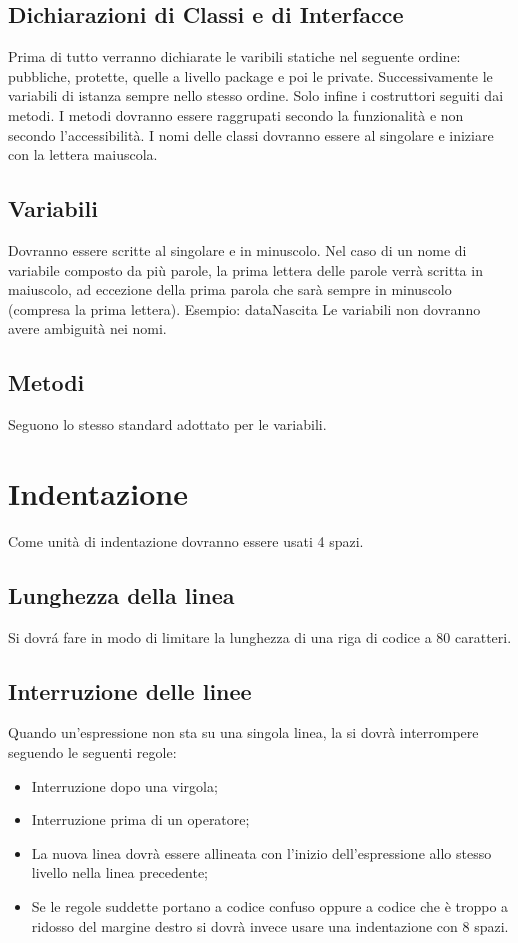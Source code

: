\subsection{Dichiarazioni di Classi e di Interfacce}
Prima di tutto verranno dichiarate le varibili statiche nel seguente ordine: pubbliche, protette, quelle a livello package e poi le private. Successivamente le variabili di istanza sempre nello stesso ordine. Solo infine i costruttori seguiti dai metodi. I metodi dovranno essere raggrupati secondo la funzionalit\`a e non secondo l'accessibilit\`a. I nomi delle classi dovranno essere al singolare e iniziare con la lettera maiuscola.
\subsection{Variabili}
Dovranno essere scritte al singolare e in minuscolo. Nel caso di un nome di variabile composto da pi\`u parole, la prima lettera delle parole verr\`a scritta in maiuscolo, ad eccezione della prima parola che sar\`a sempre in minuscolo (compresa la prima lettera). \newline
Esempio: dataNascita \newline
Le variabili non dovranno avere ambiguit\`a nei nomi.
\subsection{Metodi}
Seguono lo stesso standard adottato per le variabili.

\section{Indentazione}
Come unit\`a di indentazione dovranno essere usati 4 spazi.
\subsection{Lunghezza della linea}
Si dovr\'a fare in modo di limitare la lunghezza di una riga di codice a 80 caratteri.
\subsection{Interruzione delle linee}
Quando un'espressione non sta su una singola linea, la si dovr\`a interrompere seguendo le seguenti regole:
\begin{itemize}
\item Interruzione dopo una virgola;
\item Interruzione prima di un operatore;
\item La nuova linea dovr\`a essere allineata con l'inizio dell'espressione allo stesso livello nella linea precedente;
\item Se le regole suddette portano a codice confuso oppure a codice che è troppo a ridosso del margine destro si dovr\`a invece usare una indentazione con 8 spazi.
\end{itemize}


